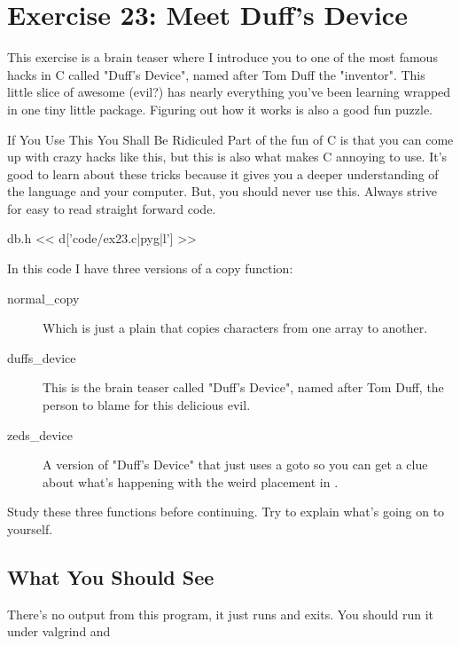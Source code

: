 \chapter{Exercise 23: Meet Duff's Device}

This exercise is a brain teaser where I introduce you to one of the
most famous hacks in C called "Duff's Device", named after Tom Duff
the "inventor".  This little slice of awesome (evil?) has nearly everything
you've been learning wrapped in one tiny little package.  Figuring out
how it works is also a good fun puzzle.

\begin{aside}{If You Use This You Shall Be Ridiculed}
Part of the fun of C is that you can come up with crazy hacks like this,
but this is also what makes C annoying to use.  It's good to learn about
these tricks because it gives you a deeper understanding of
the language and your computer.  But, you should never use this.  Always
strive for easy to read straight forward code.
\end{aside}


\begin{code}{db.h}
<< d['code/ex23.c|pyg|l'] >>
\end{code}

In this code I have three versions of a copy function:

\begin{description}
\item[normal\_copy] Which is just a plain  that copies
    characters from one array to another.
\item[duffs\_device] This is the brain teaser called "Duff's Device", named
    after Tom Duff, the person to blame for this delicious evil.
\item[zeds\_device] A version of "Duff's Device" that just uses a goto so
    you can get a clue about what's happening with the weird 
    placement in .
\end{description}

Study these three functions before continuing.  Try to explain what's
going on to yourself.


\section{What You Should See}

There's no output from this program, it just runs and exits.  You should
run it under valgrind and 

